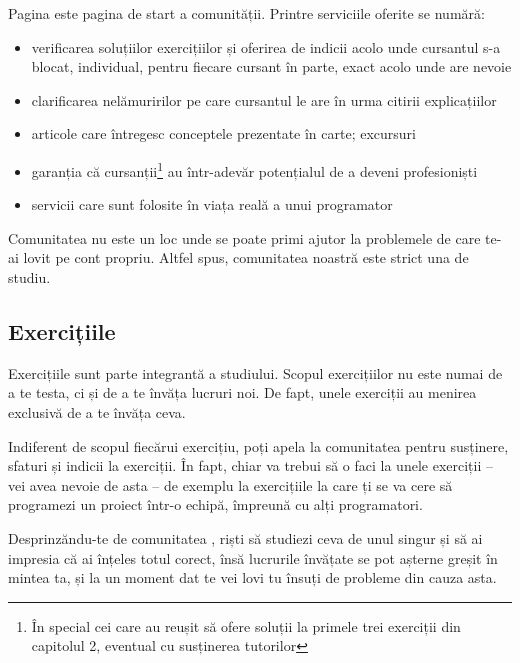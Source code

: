 Pagina {\phpro} este pagina de start a comunității. Printre serviciile oferite
se numără:

\begin{itemize}

    \item verificarea soluțiilor exercițiilor și oferirea de indicii acolo unde
        cursantul s-a blocat, individual, pentru fiecare cursant în parte, exact
        acolo unde are nevoie

    \item clarificarea nelămuririlor pe care cursantul le are în urma citirii
        explicațiilor

    \item articole care întregesc conceptele prezentate în carte; excursuri

    \item garanția că cursanții\footnote{În special cei care au reușit să ofere
        soluții la primele trei exerciții din capitolul 2, eventual cu
    susținerea tutorilor} au într-adevăr potențialul de a deveni profesioniști

    \item servicii care sunt folosite în viața reală a unui programator

\end{itemize}

Comunitatea {\phpro} nu este un loc unde se poate primi ajutor la problemele de
care te-ai lovit pe cont propriu. Altfel spus, comunitatea noastră este strict
una de studiu.

\subsection*{Exercițiile}
{}

Exercițiile sunt parte integrantă a studiului. Scopul exercițiilor nu este numai
de a te testa, ci și de a te învăța lucruri noi. De fapt, unele exerciții au
menirea exclusivă de a te învăța ceva.

Indiferent de scopul fiecărui exercițiu, poți apela la comunitatea {\phpro}
pentru susținere, sfaturi și indicii la exerciții. În fapt, chiar va trebui să
o faci la unele exerciții -- vei avea nevoie de asta -- de exemplu la
exercițiile la care ți se va cere să programezi un proiect într-o echipă,
împreună cu alți programatori.

Desprinzăndu-te de comunitatea {\phpro}, riști să studiezi ceva de unul singur
și să ai impresia că ai înțeles totul corect, însă lucrurile învățate se pot
așterne greșit în mintea ta, și la un moment dat te vei lovi tu însuți de
probleme din cauza asta.

